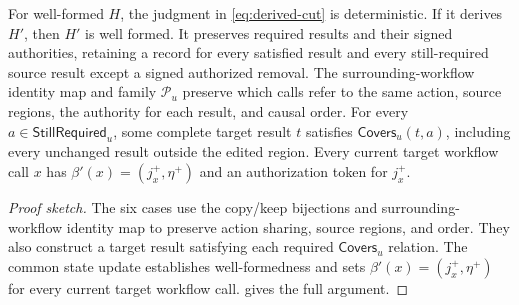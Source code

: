 \begin{lemma}
\label{lem:history-derivation}
For well-formed \(H\), the judgment in \cref{eq:derived-cut} is deterministic.
If it derives \(H'\), then \(H'\) is well formed.
It preserves required results and their signed authorities, retaining a record for every satisfied result and every still-required source result except a signed authorized removal.
The surrounding-workflow identity map and family \(\mathcal P_u\) preserve which calls refer to the same action, source regions, the authority for each result, and causal order.
For every \(a\in\mathsf{StillRequired}_u\), some complete target result \(t\) satisfies \(\mathsf{Covers}_u(t,a)\), including every unchanged result outside the edited region.
Every current target workflow call \(x\) has \(\beta'(x)=(j_x^+,\eta^+)\) and an authorization token for \(j_x^+\).
\end{lemma}
\begin{proof}[Proof sketch]
The six cases use the copy/keep bijections and surrounding-workflow identity map to preserve action sharing, source regions, and order.
They also construct a target result satisfying each required \(\mathsf{Covers}_u\) relation.
The common state update establishes well-formedness and sets \(\beta'(x)=(j_x^+,\eta^+)\) for every current target workflow call.
 gives the full argument.
\end{proof}
